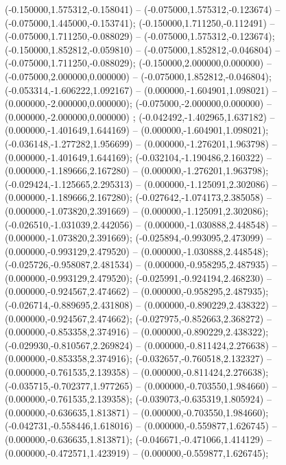  (-0.150000,1.575312,-0.158041) -- (-0.075000,1.575312,-0.123674) -- (-0.075000,1.445000,-0.153741);
 (-0.150000,1.711250,-0.112491) -- (-0.075000,1.711250,-0.088029) -- (-0.075000,1.575312,-0.123674);
 (-0.150000,1.852812,-0.059810) -- (-0.075000,1.852812,-0.046804) -- (-0.075000,1.711250,-0.088029);
 (-0.150000,2.000000,0.000000) -- (-0.075000,2.000000,0.000000) -- (-0.075000,1.852812,-0.046804);
 (-0.053314,-1.606222,1.092167) -- (0.000000,-1.604901,1.098021) -- (0.000000,-2.000000,0.000000);
 (-0.075000,-2.000000,0.000000) -- (0.000000,-2.000000,0.000000) ;
 (-0.042492,-1.402965,1.637182) -- (0.000000,-1.401649,1.644169) -- (0.000000,-1.604901,1.098021);
 (-0.036148,-1.277282,1.956699) -- (0.000000,-1.276201,1.963798) -- (0.000000,-1.401649,1.644169);
 (-0.032104,-1.190486,2.160322) -- (0.000000,-1.189666,2.167280) -- (0.000000,-1.276201,1.963798);
 (-0.029424,-1.125665,2.295313) -- (0.000000,-1.125091,2.302086) -- (0.000000,-1.189666,2.167280);
 (-0.027642,-1.074173,2.385058) -- (0.000000,-1.073820,2.391669) -- (0.000000,-1.125091,2.302086);
 (-0.026510,-1.031039,2.442056) -- (0.000000,-1.030888,2.448548) -- (0.000000,-1.073820,2.391669);
 (-0.025894,-0.993095,2.473099) -- (0.000000,-0.993129,2.479520) -- (0.000000,-1.030888,2.448548);
 (-0.025726,-0.958087,2.481534) -- (0.000000,-0.958295,2.487935) -- (0.000000,-0.993129,2.479520);
 (-0.025991,-0.924194,2.468230) -- (0.000000,-0.924567,2.474662) -- (0.000000,-0.958295,2.487935);
 (-0.026714,-0.889695,2.431808) -- (0.000000,-0.890229,2.438322) -- (0.000000,-0.924567,2.474662);
 (-0.027975,-0.852663,2.368272) -- (0.000000,-0.853358,2.374916) -- (0.000000,-0.890229,2.438322);
 (-0.029930,-0.810567,2.269824) -- (0.000000,-0.811424,2.276638) -- (0.000000,-0.853358,2.374916);
 (-0.032657,-0.760518,2.132327) -- (0.000000,-0.761535,2.139358) -- (0.000000,-0.811424,2.276638);
 (-0.035715,-0.702377,1.977265) -- (0.000000,-0.703550,1.984660) -- (0.000000,-0.761535,2.139358);
 (-0.039073,-0.635319,1.805924) -- (0.000000,-0.636635,1.813871) -- (0.000000,-0.703550,1.984660);
 (-0.042731,-0.558446,1.618016) -- (0.000000,-0.559877,1.626745) -- (0.000000,-0.636635,1.813871);
 (-0.046671,-0.471066,1.414129) -- (0.000000,-0.472571,1.423919) -- (0.000000,-0.559877,1.626745);
